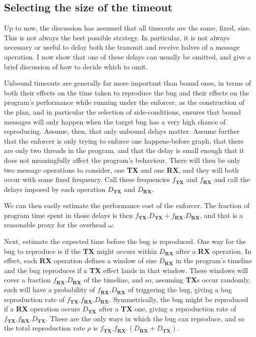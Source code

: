 \subsection{Selecting the size of the timeout}
\label{sect:using:timeout_balancing}


Up to now, the discussion has assumed that all timeouts are the same,
fixed, size.  This is not always the best possible strategy.  In
particular, it is not always necessary or useful to delay both the
transmit and receive halves of a message operation.  I now show that
one of these delays can usually be omitted, and give a brief
discussion of how to decide which to omit.

Unbound timeouts are generally far more important than bound ones, in
terms of both their effects on the time taken to reproduce the bug and
their effects on the program's performance while running under the
enforcer, as the construction of the plan, and in particular the
selection of side-conditions, ensures that bound messages will only
happen when the target bug has a very high chance of reproducing.
Assume, then, that only unbound delays matter.  Assume further that
the enforcer is only trying to enforce one happens-before graph, that
there are only two threads in the program, and that the delay is small
enough that it does not meaningfully affect the program's behaviour.
There will then be only two message operations to consider, one
\textbf{TX} and one \textbf{RX}, and they will both occur with some
fixed frequency.  Call these frequencies $f_{\mathbf{TX}}$ and
$f_{\mathbf{RX}}$ and call the delays imposed by each operation
$D_{\mathbf{TX}}$ and $D_{\mathbf{RX}}$.

We can then easily estimate the performance cost of the enforcer.  The
fraction of program time spent in those delays is then
$f_{\mathbf{TX}}.D_{\mathbf{TX}} + f_{\mathbf{RX}}.D_{\mathbf{RX}}$,
and that is a reasonable proxy for the overhead $\omega$.

Next, estimate the expected time before the bug is reproduced.  One
way for the bug to reproduce is if the \textbf{TX} might occurs within
$D_{\mathbf{RX}}$ after a \textbf{RX} operation.  In effect, each
\textbf{RX} operation defines a window of size $D_{\mathbf{RX}}$ in
the program's timeline and the bug reproduces if a \textbf{TX} effect
lands in that window.  These windows will cover a fraction
$f_{\mathbf{RX}}.D_{\mathbf{RX}}$ of the timeline, and so, assuming
\textbf{TX}s occur randomly, each will have a probability of
$f_{\mathbf{RX}}.D_{\mathbf{RX}}$ of triggering the bug, giving a bug
reproduction rate of
$f_{\mathbf{TX}}.f_{\mathbf{RX}}.D_{\mathbf{RX}}$.  Symmetrically, the
bug might be reproduced if a \textbf{RX} operation occurs
$D_{\mathbf{TX}}$ after a \textbf{TX} one, giving a reproduction rate
of $f_{\mathbf{TX}}.f_{\mathbf{RX}}.D_{\mathbf{TX}}$.  These are the
only ways in which the bug can reproduce, and so the total
reproduction rate $\rho$ is
$f_{\mathbf{TX}}.f_{\mathbf{RX}}.(D_{\mathbf{RX}} + D_{\mathbf{TX}})$.

